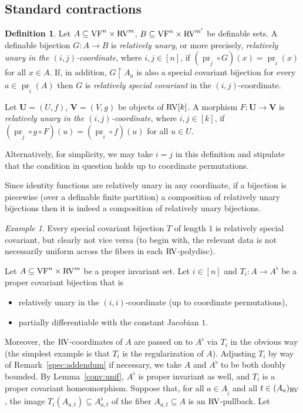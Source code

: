 \documentclass[12pt]{amsart}
\newcommand{\memph}[1]{{\color{magenta}\emph{#1}}}
\theoremstyle{plain}
\theoremstyle{definition}
\newtheorem{defn}[thm]{Definition}
\theoremstyle{remark}
\newtheorem{exam}[thm]{Example}
\numberwithin{equation}{section}
\theoremstyle{plain}
\newcommand{\VF}{\textup{VF}}
\newcommand{\RV}{\textup{RV}}
\DeclareMathOperator{\pr}{pr}
\newcommand{\0}{\emptyset}
\newcommand{\rest}{\upharpoonright}
\newcommand{\fun}{\longrightarrow}
\newcommand{\sub}{\subseteq}
\begin{document}
\subsection{Standard contractions}

\begin{defn}\label{rela:unary}
Let $A \sub \VF^{n} \times \RV^{m}$, $B \sub \VF^{n} \times \RV^{m'}$ be definable sets. A definable bijection $G : A \fun B$ is \memph{relatively unary}, or more precisely, \memph{relatively unary in the $(i, j)$-coordinate}, where $i, j \in [n]$, if $(\pr_{\tilde{j}} \circ G)(x) = \pr_{\tilde{i}}(x)$ for all $x \in A$. If, in addition, $G \rest A_a$ is also a special covariant bijection for every $a \in \pr_{\tilde{i}} (A)$ then $G$ is \memph{relatively special covariant} in the $(i, j)$-coordinate.

Let $\bm U = (U, f)$, $\bm V = (V, g)$ be objects of $\RV[k]$. A morphism $F : \bm U \fun \bm V$ is \memph{relatively unary in the $(i, j)$-coordinate}, where $i,j \in [k]$, if $(\pr_{\tilde{j}} \circ g \circ F)(u) = (\pr_{\tilde{i}} \circ f)(u)$ for all $u \in U$.
\end{defn}

Alternatively, for simplicity, we may take $i = j$ in this definition and stipulate that the condition in question holds up to coordinate permutations.

Since identity functions are relatively unary in any coordinate, if a  bijection  is piecewise (over a definable finite partition) a composition of relatively unary bijections then it is indeed a composition of relatively unary bijections.

\begin{exam}
Every  special covariant bijection $T$ of length $1$ is relatively special covariant, but clearly not vice versa (to begin with, the relevant data is not necessarily uniform across the fibers in each $\RV$-polydisc).
\end{exam}

Let $A \sub \VF^{n} \times \RV^{m}$ be a proper invariant set. Let $i \in [n]$ and $T_i : A \fun A^\flat$ be a proper covariant bijection that is
\begin{itemize}
  \item relatively unary in the $(i, i)$-coordinate (up to coordinate permutations),
  \item partially differentiable with the constant Jacobian $1$.
\end{itemize}
Moreover, the $\RV$-coordinates of $A$ are passed on to $A^\flat$ via $T_i$ in the obvious way (the simplest example is that $T_i$ is the regularization of $A$). Adjusting $T_i$ by way of Remark~\ref{spec:addendum} if necessary, we take $A$ and $A^\flat$ to be both doubly bounded. By Lemma~\ref{conv:unif}, $A^\flat$ is proper invariant as well, and $T_i$ is a proper covariant homeomorphism. Suppose that, for all $a \in A_{\tilde i}$ and all $t \in (A_{a})_{\RV}$, the image $T_i(A_{a, t}) \sub A_{a, t}^\flat$ of the fiber $A_{a, t} \sub A$ is an $\RV$-pullback.  Let
\end{document}
